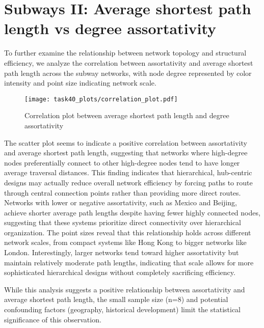 \section{Subways II: Average shortest path length vs degree assortativity}

To further examine the relationship between network topology and structural efficiency, we analyze the correlation between assortativity and average shortest path length across the subway networks, with node degree represented by color intensity and point size indicating network scale.

\begin{figure}[h!]
    \centering
    \texttt{[image: task40\_plots/correlation\_plot.pdf]}
    \caption{Correlation plot between average shortest path length and degree assortativity}
    \label{fig:aspl_vs_assort}
\end{figure}

The scatter plot seems to indicate a positive correlation between assortativity and average shortest path length, suggesting that networks where high-degree nodes preferentially connect to other high-degree nodes tend to have longer average traversal distances. This finding indicates that hierarchical, hub-centric designs may actually reduce overall network efficiency by forcing paths to route through central connection points rather than providing more direct routes. Networks with lower or negative assortativity, such as Mexico and Beijing, achieve shorter average path lengths despite having fewer highly connected nodes, suggesting that these systems prioritize direct connectivity over hierarchical organization. The point sizes reveal that this relationship holds across different network scales, from compact systems like Hong Kong to bigger networks like London. Interestingly, larger networks tend toward higher assortativity but maintain relatively moderate path lengths, indicating that scale allows for more sophisticated hierarchical designs without completely sacrificing efficiency.

While this analysis suggests a positive relationship between assortativity and average shortest path length, the small sample size (n=8) and potential confounding factors (geography, historical development) limit the statistical significance of this observation. 


